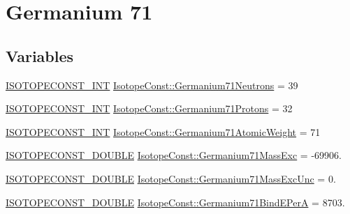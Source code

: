 \hypertarget{group___isotope_const-_germanium-_ge71}{}\section{Germanium 71}
\label{group___isotope_const-_germanium-_ge71}
\subsection*{Variables}
\begin{DoxyCompactItemize}
\item 
\mbox{\hyperlink{group___isotope_const-_macros_ga5f18360b3e99483a35c32d789e62621c}{I\+S\+O\+T\+O\+P\+E\+C\+O\+N\+S\+T\+\_\+\+I\+NT}} \mbox{\hyperlink{group___isotope_const-_germanium-_ge71_ga6968cea03e392f7c28d815e087df08ba}{Isotope\+Const\+::\+Germanium71\+Neutrons}} = 39
\item 
\mbox{\hyperlink{group___isotope_const-_macros_ga5f18360b3e99483a35c32d789e62621c}{I\+S\+O\+T\+O\+P\+E\+C\+O\+N\+S\+T\+\_\+\+I\+NT}} \mbox{\hyperlink{group___isotope_const-_germanium-_ge71_ga91694126d86845b5b996446d2aa0074a}{Isotope\+Const\+::\+Germanium71\+Protons}} = 32
\item 
\mbox{\hyperlink{group___isotope_const-_macros_ga5f18360b3e99483a35c32d789e62621c}{I\+S\+O\+T\+O\+P\+E\+C\+O\+N\+S\+T\+\_\+\+I\+NT}} \mbox{\hyperlink{group___isotope_const-_germanium-_ge71_gadb4d7b78da3662143cbd30d9a7f00c9e}{Isotope\+Const\+::\+Germanium71\+Atomic\+Weight}} = 71
\item 
\mbox{\hyperlink{group___isotope_const-_macros_ga8f45a7272ce02c0b4c65c44636ed719a}{I\+S\+O\+T\+O\+P\+E\+C\+O\+N\+S\+T\+\_\+\+D\+O\+U\+B\+LE}} \mbox{\hyperlink{group___isotope_const-_germanium-_ge71_ga12a415c1f110b59bdbc36ff8e4513b9d}{Isotope\+Const\+::\+Germanium71\+Mass\+Exc}} = -\/69906.
\item 
\mbox{\hyperlink{group___isotope_const-_macros_ga8f45a7272ce02c0b4c65c44636ed719a}{I\+S\+O\+T\+O\+P\+E\+C\+O\+N\+S\+T\+\_\+\+D\+O\+U\+B\+LE}} \mbox{\hyperlink{group___isotope_const-_germanium-_ge71_gaf17a9ab1b12c36789b78884d2d148377}{Isotope\+Const\+::\+Germanium71\+Mass\+Exc\+Unc}} = 0.
\item 
\mbox{\hyperlink{group___isotope_const-_macros_ga8f45a7272ce02c0b4c65c44636ed719a}{I\+S\+O\+T\+O\+P\+E\+C\+O\+N\+S\+T\+\_\+\+D\+O\+U\+B\+LE}} \mbox{\hyperlink{group___isotope_const-_germanium-_ge71_gac506b8240e0f42de253b4119793021ea}{Isotope\+Const\+::\+Germanium71\+Bind\+E\+PerA}} = 8703.
\item 

\end{DoxyCompactItemize}
